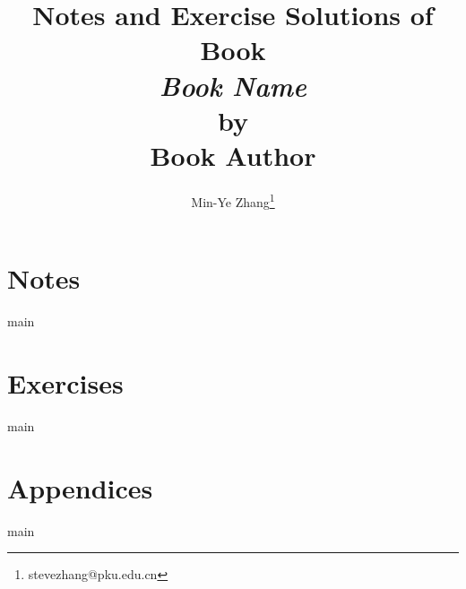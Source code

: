 \documentclass[a4paper,12pt]{report}
\newcommand{\booktitle}{Book Name}
\newcommand{\bookauthor}{Book Author}
\begin{document}
\title{Notes and Exercise Solutions of Book \\ \textit{\booktitle} \\ by \\ \bookauthor}
\author{Min-Ye Zhang\thanks{stevezhang@pku.edu.cn}}

\maketitle
\clearpage
\tableofcontents
\clearpage

\part{Notes}
{main}
\part{Exercises}
{main}

\part*{Appendices}
{main}

\end{document}

